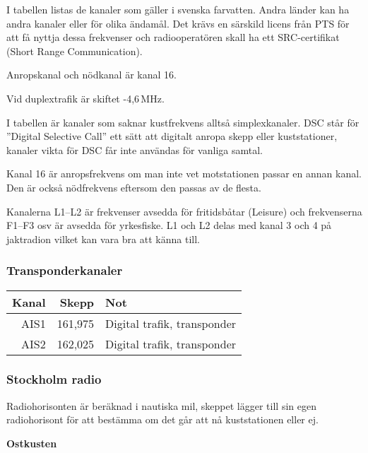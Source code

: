 I tabellen listas de kanaler som gäller i svenska farvatten. Andra länder kan ha andra kanaler eller för olika ändamål. Det krävs en särskild licens från PTS för att få nyttja dessa frekvenser och radiooperatören skall ha ett SRC-certifikat (Short Range Communication).

Anropskanal och nödkanal är kanal 16.

Vid duplextrafik är skiftet -4,6\,MHz.

I tabellen är kanaler som saknar kustfrekvens alltså simplexkanaler. DSC står för ''Digital Selective Call'' ett sätt att digitalt anropa skepp eller kuststationer, kanaler vikta för DSC får inte användas för vanliga samtal.

Kanal 16 är anropsfrekvens om man inte vet motstationen passar en annan kanal. Den är också nödfrekvens eftersom den passas av de flesta. 

Kanalerna L1--L2 är frekvenser avsedda för fritidsbåtar (Leisure) och frekvenserna F1--F3 osv är avsedda för yrkesfiske. L1 och L2 delas med kanal 3 och 4 på jaktradion vilket kan vara bra att känna till.

\subsubsection{Transponderkanaler}
\begin{longtable}{rrl}
	\textbf{Kanal} & \textbf{Skepp} & \textbf{Not} \\ \hline
	   \endhead
AIS1 & 161,975 & Digital trafik, transponder\\
AIS2 & 162,025 & Digital trafik, transponder\\
\end{longtable}

\subsubsection{Stockholm radio}

Radiohorisonten är beräknad i nautiska mil, skeppet lägger till sin egen radiohorisont för att bestämma om det går att nå kuststationen eller ej.

\textbf{Ostkusten}

